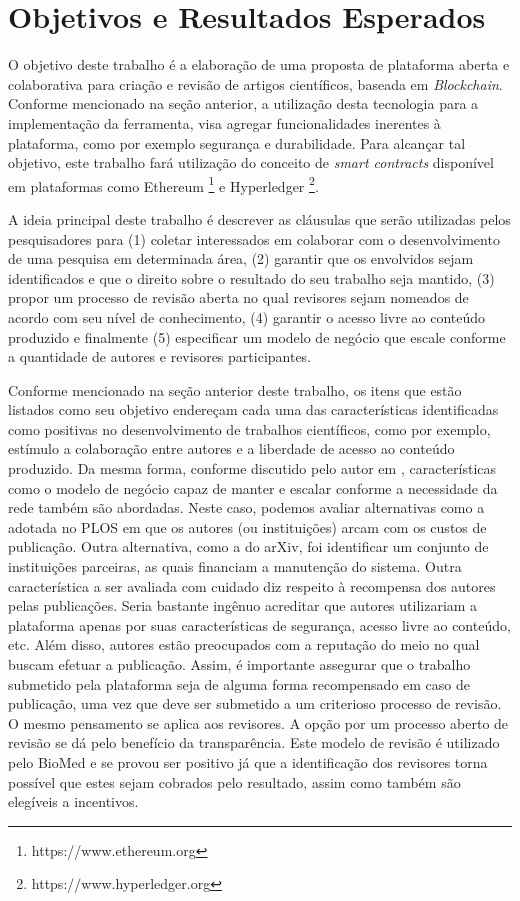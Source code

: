 \chapter{Objetivos e Resultados Esperados}
O objetivo deste trabalho é a elaboração de uma proposta de plataforma aberta e colaborativa para criação e revisão de artigos científicos, baseada em \textit{Blockchain}. Conforme mencionado na seção anterior, a utilização desta tecnologia para a implementação da ferramenta, visa agregar funcionalidades inerentes à plataforma, como por exemplo segurança e durabilidade. Para alcançar tal objetivo, este trabalho fará utilização do conceito de \textit{smart contracts} disponível em plataformas como Ethereum \footnote{https://www.ethereum.org} e Hyperledger \footnote{https://www.hyperledger.org}.

A ideia principal deste trabalho é descrever as cláusulas que serão utilizadas pelos pesquisadores para (1) coletar interessados em colaborar com o desenvolvimento de uma pesquisa em determinada área, (2) garantir que os envolvidos sejam identificados e que o direito sobre o resultado do seu trabalho seja mantido, (3) propor um processo de revisão aberta no qual revisores sejam nomeados de acordo com seu nível de conhecimento, (4) garantir o acesso livre ao conteúdo produzido e finalmente (5) especificar um modelo de negócio que escale conforme a quantidade de autores e revisores participantes.

Conforme mencionado na seção anterior deste trabalho, os itens que estão listados como seu objetivo endereçam cada uma das características identificadas como positivas no desenvolvimento de trabalhos científicos, como por exemplo, estímulo a colaboração entre autores e a liberdade de acesso ao conteúdo produzido. Da mesma forma, conforme discutido pelo autor em \cite{OpenAccessAnalysis2004}, características como o modelo de negócio capaz de manter e escalar conforme a necessidade da rede também são abordadas. Neste caso, podemos avaliar alternativas como a adotada no PLOS em que os autores (ou instituições) arcam com os custos de publicação. Outra alternativa, como a do arXiv, foi identificar um conjunto de instituições parceiras, as quais financiam a manutenção do sistema. Outra característica a ser avaliada com cuidado diz respeito à recompensa dos autores pelas publicações. Seria bastante ingênuo acreditar que autores utilizariam a plataforma apenas por suas características de segurança, acesso livre ao conteúdo, etc. Além disso, autores estão preocupados com a reputação do meio no qual buscam efetuar a publicação. Assim, é importante assegurar que o trabalho submetido pela plataforma seja de alguma forma recompensado em caso de publicação, uma vez que deve ser submetido a um criterioso processo de revisão. O mesmo pensamento se aplica aos revisores. A opção por um processo aberto de revisão se dá pelo benefício da transparência. Este modelo de revisão é utilizado pelo BioMed e se provou ser positivo já que a identificação dos revisores torna possível que estes sejam cobrados pelo resultado, assim como também são elegíveis a incentivos.

